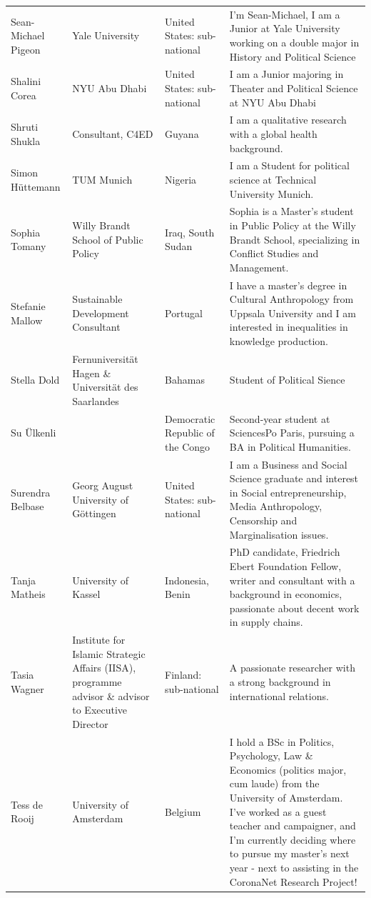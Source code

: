 \documentclass[]{article}
\begin{document}
\begin{longtable}{l>{\raggedright\arraybackslash}p{2cm}>{\raggedright\arraybackslash}p{2cm}>{\raggedright\arraybackslash}p{3cm}}
Sean-Michael Pigeon & Yale University & United States: sub-national & I'm Sean-Michael, I am a Junior at Yale University working on a double major in History and Political Science\\
\rowcolor{gray!6}  Shalini Corea & NYU Abu Dhabi & United States: sub-national & I am a Junior majoring in Theater and Political Science at NYU Abu Dhabi\\
\addlinespace
Shruti Shukla & Consultant, C4ED & Guyana & I am a qualitative research with a global health background.\\
\rowcolor{gray!6}  Simon Hüttemann & TUM Munich & Nigeria & I am a Student for political science at Technical University Munich.\\
Sophia Tomany & Willy Brandt School of Public Policy & Iraq, South Sudan & Sophia is a Master's student in Public Policy at the Willy Brandt School, specializing in Conflict Studies and Management.\\
\rowcolor{gray!6}  Stefanie Mallow & Sustainable Development Consultant & Portugal & I have a master's degree in Cultural Anthropology from Uppsala University and I am interested in inequalities in knowledge production.\\
Stella Dold & Fernuniversität Hagen \& Universität des Saarlandes & Bahamas & Student of Political Sience\\
\addlinespace
\rowcolor{gray!6}  Su Ülkenli &  & Democratic Republic of the Congo & Second-year student at SciencesPo Paris, pursuing a BA in Political Humanities.\\
Surendra Belbase & Georg August University of Göttingen & United States: sub-national & I am a Business and Social Science graduate and interest in Social entrepreneurship, Media Anthropology, Censorship and Marginalisation issues.\\
\rowcolor{gray!6}  Tanja Matheis & University of Kassel & Indonesia, Benin & PhD candidate, Friedrich Ebert Foundation Fellow, writer and consultant with a background in economics, passionate about decent work in supply chains.\\
Tasia Wagner & Institute for Islamic Strategic Affairs (IISA),  programme advisor \& advisor to Executive Director & Finland: sub-national & A passionate researcher with a strong background in international relations.\\
\rowcolor{gray!6}  Tess de Rooij & University of Amsterdam & Belgium & I hold a BSc in Politics, Psychology, Law \& Economics (politics major, cum laude) from the University of Amsterdam. I've worked as a guest teacher and campaigner, and I'm currently deciding where to pursue my master's next year - next to assisting in the CoronaNet Research Project!\\

\end{longtable}
\end{document}
